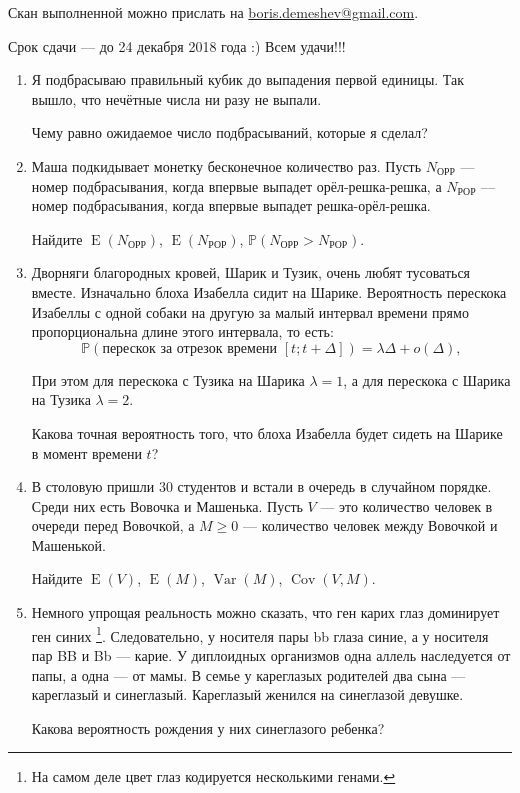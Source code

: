\documentclass[12pt]{article}
\DeclareMathOperator{\Cov}{Cov}
\DeclareMathOperator{\Var}{Var}
\DeclareMathOperator{\E}{E}
\def \P{\mathbb{P}}
\begin{document}
Скан выполненной можно прислать на \url{boris.demeshev@gmail.com}.

Срок сдачи — до 24 декабря 2018 года :) Всем удачи!!!

\begin{enumerate}
  \item Я подбрасываю правильный кубик до выпадения первой единицы. Так вышло,
  что нечётные числа ни разу не выпали.

  Чему равно ожидаемое число подбрасываний, которые я сделал?

  \item Маша подкидывает монетку бесконечное количество раз.
  Пусть $N_{\text{ОРР}}$ — номер подбрасывания, когда впервые выпадет орёл-решка-решка,
  а $N_{\text{РОР}}$ — номер подбрасывания, когда впервые выпадет решка-орёл-решка.

  Найдите $\E(N_{\text{ОРР}})$, $\E(N_{\text{РОР}})$, $\P(N_{\text{ОРР}}>N_{\text{РОР}})$.

  \item
Дворняги благородных кровей, Шарик и Тузик, очень любят тусоваться вместе.
Изначально блоха Изабелла сидит на Шарике.
Вероятность перескока Изабеллы с одной собаки на другую за малый интервал времени
прямо пропорциональна длине этого интервала, то есть:
\[
\P(\text{перескок за отрезок времени }[t;t+\Delta]) = \lambda \Delta + o(\Delta),
\]

При этом для перескока с Тузика на Шарика $\lambda=1$, а для перескока
с Шарика на Тузика $\lambda=2$.

Какова точная вероятность того, что блоха Изабелла будет сидеть на Шарике
в момент времени $t$?
\item В столовую пришли 30 студентов и встали в очередь в случайном порядке.
Среди них есть Вовочка и Машенька. Пусть $V$ — это количество человек в очереди
перед Вовочкой, а $M\geq 0$ — количество человек между Вовочкой и Машенькой.

Найдите $\E(V)$, $\E(M)$, $\Var(M)$, $\Cov(V, M)$.

  \item
Немного упрощая реальность можно сказать, что ген карих глаз доминирует ген синих
\footnote{На самом деле цвет глаз кодируется несколькими генами.}.
Следовательно, у носителя пары bb глаза синие, а у носителя пар BB и Bb — карие.
У диплоидных организмов одна аллель наследуется от папы,
а одна — от мамы. В семье у кареглазых родителей два сына — кареглазый и
синеглазый. Кареглазый женился на синеглазой девушке.

Какова вероятность рождения у них синеглазого ребенка?


\end{enumerate}
\end{document}
